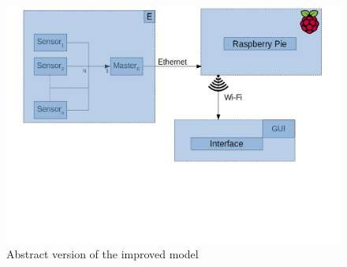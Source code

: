 \begin{figure}[h]
	\centering
	\includegraphics[width=.75\textwidth]{ERBI-Model-RaspPie}
	\caption{Abstract version of the improved model} 
	\label{fig:improvedmodel}
\end{figure} 
